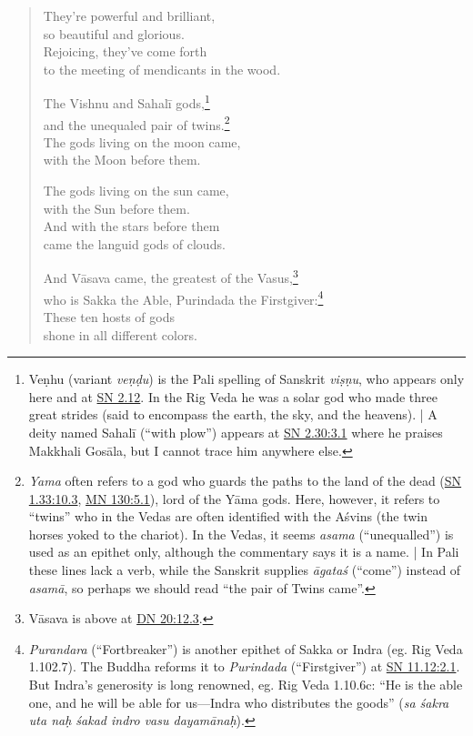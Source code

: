 \documentclass[12pt,openany]{book}%
\begin{document}
\begin{verse}
They’re powerful and brilliant, \\
so beautiful and glorious. \\
Rejoicing, they’ve come forth \\
to the meeting of mendicants in the wood. 

The Vishnu and \textsanskrit{Sahalī} gods,\footnote{\textsanskrit{Veṇhu} (variant \textit{\textsanskrit{veṇḍu}}) is the Pali spelling of Sanskrit \textit{\textsanskrit{viṣṇu}}, who appears only here and at \href{https://suttacentral.net/sn2.12/en/sujato}{SN 2.12}. In the Rig Veda he was a solar god who made three great strides (said to encompass the earth, the sky, and the heavens). | A deity named \textsanskrit{Sahalī} (“with plow”) appears at \href{https://suttacentral.net/sn2.30/en/sujato\#3.1}{SN 2.30:3.1} where he praises Makkhali \textsanskrit{Gosāla}, but I cannot trace him anywhere else. } \\
and the unequaled pair of twins.\footnote{\textit{Yama} often refers to a god who guards the paths to the land of the dead (\href{https://suttacentral.net/sn1.33/en/sujato\#10.3}{SN 1.33:10.3}, \href{https://suttacentral.net/mn130/en/sujato\#5.1}{MN 130:5.1}), lord of the \textsanskrit{Yāma} gods. Here, however, it refers to “twins” who in the Vedas are often identified with the \textsanskrit{Aśvins} (the twin horses yoked to the chariot). In the Vedas, it seems \textit{asama} (“unequalled”) is used as an epithet only, although the commentary says it is a name. | In Pali these lines lack a verb, while the Sanskrit supplies \textit{\textsanskrit{āgataś}} (“come”) instead of \textit{\textsanskrit{asamā}}, so perhaps we should read “the pair of Twins came”. } \\
The gods living on the moon came, \\
with the Moon before them. 

The gods living on the sun came, \\
with the Sun before them. \\
And with the stars before them \\
came the languid gods of clouds. 

And \textsanskrit{Vāsava} came, the greatest of the Vasus,\footnote{\textsanskrit{Vāsava} is above at \href{https://suttacentral.net/dn20/en/sujato\#12.3}{DN 20:12.3}. } \\
who is Sakka the Able, Purindada the Firstgiver:\footnote{\textit{Purandara} (“Fortbreaker”) is another epithet of Sakka or Indra (eg. Rig Veda 1.102.7). The Buddha reforms it to \textit{Purindada} (“Firstgiver”) at \href{https://suttacentral.net/sn11.12/en/sujato\#2.1}{SN 11.12:2.1}. But Indra’s generosity is long renowned, eg. Rig Veda 1.10.6c: “He is the able one, and he will be able for us—Indra who distributes the goods” (\textit{sa \textsanskrit{śakra} uta naḥ \textsanskrit{śakad} indro vasu \textsanskrit{dayamānaḥ}}). } \\
These ten hosts of gods \\
shone in all different colors. 


\end{verse}
\end{document}
